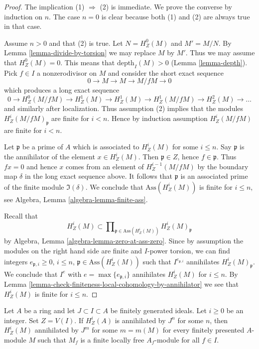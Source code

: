 \begin{proof}
The implication (1) $\Rightarrow$ (2) is immediate. We prove the converse
by induction on $n$. The case $n = 0$ is clear because both (1) and
(2) are always true in that case.

\medskip\noindent
Assume $n > 0$ and that (2) is true. Let $N = H^0_Z(M)$ and $M' = M/N$.
By Lemma \ref{lemma-divide-by-torsion} we may replace $M$ by $M'$.
Thus we may assume that $H^0_Z(M) = 0$.
This means that $\text{depth}_I(M) > 0$ (Lemma \ref{lemma-depth}).
Pick $f \in I$ a nonzerodivisor on $M$ and consider the short
exact sequence
$$
0 \to M \to M \to M/fM \to 0
$$
which produces a long exact sequence
$$
0 \to H^0_Z(M/fM) \to H^1_Z(M) \to H^1_Z(M) \to H^1_Z(M/fM) \to
H^2_Z(M) \to \ldots
$$
and similarly after localization. Thus assumption (2) implies that
the modules $H^i_Z(M/fM)_\mathfrak p$ are finite for $i < n$. Hence
by induction assumption $H^i_Z(M/fM)$ are finite for $i < n$.

\medskip\noindent
Let $\mathfrak p$ be a prime of $A$ which is associated to
$H^i_Z(M)$ for some $i \leq n$. Say $\mathfrak p$ is the annihilator
of the element $x \in H^i_Z(M)$. Then $\mathfrak p \in Z$, hence
$f \in \mathfrak p$. Thus $fx = 0$ and hence $x$ comes from an
element of $H^{i - 1}_Z(M/fM)$ by the boundary map $\delta$ in the long
exact sequence above. It follows that $\mathfrak p$ is an associated
prime of the finite module $\Im(\delta)$. We conclude that
$\text{Ass}(H^i_Z(M))$ is finite for $i \leq n$, see
Algebra, Lemma \ref{algebra-lemma-finite-ass}.

\medskip\noindent
Recall that
$$
H^i_Z(M) \subset
\prod\nolimits_{\mathfrak p \in \text{Ass}(H^i_Z(M))}
H^i_Z(M)_\mathfrak p
$$
by Algebra, Lemma \ref{algebra-lemma-zero-at-ass-zero}. Since by
assumption the modules on the right hand side are finite and $I$-power
torsion, we can find integers $e_{\mathfrak p, i} \geq 0$, $i \leq n$,
$\mathfrak p \in \text{Ass}(H^i_Z(M))$ such that
$I^{e_{\mathfrak p, i}}$ annihilates $H^i_Z(M)_\mathfrak p$. We conclude
that $I^e$ with $e = \max\{e_{\mathfrak p, i}\}$ annihilates $H^i_Z(M)$
for $i \leq n$. By
Lemma \ref{lemma-check-finiteness-local-cohomology-by-annihilator}
we see that $H^i_Z(M)$ is finite for $i \leq n$.
\end{proof}

\begin{lemma}
\label{lemma-annihilate-local-cohomology}
Let $A$ be a ring and let $J \subset I \subset A$ be finitely generated ideals.
Let $i \geq 0$ be an integer. Set $Z = V(I)$. If
$H^i_Z(A)$ is annihilated by $J^n$ for some $n$, then
$H^i_Z(M)$ annihilated by $J^m$ for some $m = m(M)$
for every finitely presented $A$-module $M$ such that
$M_f$ is a finite locally free $A_f$-module for all $f \in I$.
\end{lemma}

